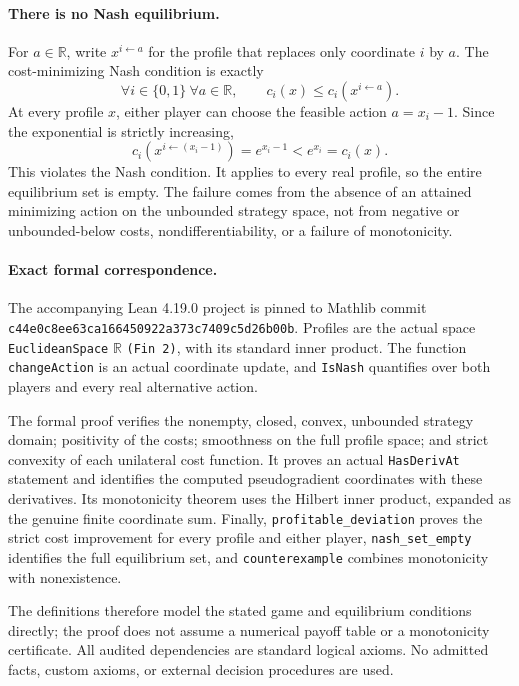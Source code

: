 \documentclass[11pt]{article}
\begin{document}
\paragraph{There is no Nash equilibrium.}
For $a\in\mathbb R$, write $x^{i\leftarrow a}$ for the profile that replaces only coordinate $i$ by $a$. The cost-minimizing Nash condition is exactly
\[
\forall i\in\{0,1\}\ \forall a\in\mathbb R,
\qquad c_i(x)\leq c_i(x^{i\leftarrow a}).
\]
At every profile $x$, either player can choose the feasible action $a=x_i-1$. Since the exponential is strictly increasing,
\[
c_i(x^{i\leftarrow(x_i-1)})=e^{x_i-1}<e^{x_i}=c_i(x).
\]
This violates the Nash condition. It applies to every real profile, so the entire equilibrium set is empty. The failure comes from the absence of an attained minimizing action on the unbounded strategy space, not from negative or unbounded-below costs, nondifferentiability, or a failure of monotonicity.

\paragraph{Exact formal correspondence.}
The accompanying Lean 4.19.0 project is pinned to Mathlib commit \texttt{c44e0c8ee63ca166450922a373c7409c5d26b00b}. Profiles are the actual space \texttt{EuclideanSpace} $\mathbb R$ \texttt{(Fin 2)}, with its standard inner product. The function \texttt{changeAction} is an actual coordinate update, and \texttt{IsNash} quantifies over both players and every real alternative action.

The formal proof verifies the nonempty, closed, convex, unbounded strategy domain; positivity of the costs; smoothness on the full profile space; and strict convexity of each unilateral cost function. It proves an actual \texttt{HasDerivAt} statement and identifies the computed pseudogradient coordinates with these derivatives. Its monotonicity theorem uses the Hilbert inner product, expanded as the genuine finite coordinate sum. Finally, \texttt{profitable\_deviation} proves the strict cost improvement for every profile and either player, \texttt{nash\_set\_empty} identifies the full equilibrium set, and \texttt{counterexample} combines monotonicity with nonexistence.

The definitions therefore model the stated game and equilibrium conditions directly; the proof does not assume a numerical payoff table or a monotonicity certificate. All audited dependencies are standard logical axioms. No admitted facts, custom axioms, or external decision procedures are used.
\end{document}
